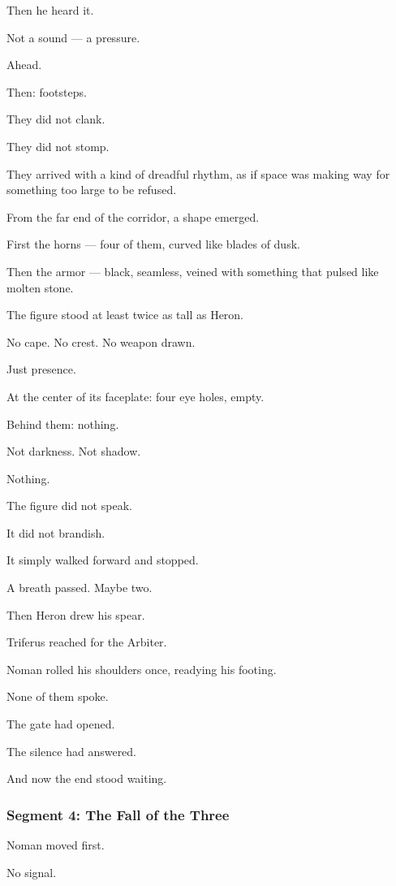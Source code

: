 \documentclass[9pt]{article}
\begin{document}
Then he heard it.

Not a sound — a pressure.

Ahead.

Then: footsteps.

\bigskip

They did not clank.

They did not stomp.

They arrived with a kind of dreadful rhythm, as if space was making way for something too large to be refused.

From the far end of the corridor, a shape emerged.

First the horns — four of them, curved like blades of dusk.

Then the armor — black, seamless, veined with something that pulsed like molten stone.

The figure stood at least twice as tall as Heron.

No cape. No crest. No weapon drawn.

Just presence.

At the center of its faceplate: four eye holes, empty.

Behind them: nothing.

Not darkness. Not shadow.

Nothing.

\bigskip

The figure did not speak.

It did not brandish.

It simply walked forward and stopped.

A breath passed. Maybe two.

Then Heron drew his spear.

Triferus reached for the Arbiter.

Noman rolled his shoulders once, readying his footing.

None of them spoke.

The gate had opened.

The silence had answered.

And now the end stood waiting.

\newpage

\subsubsection*{Segment 4: The Fall of the Three}

Noman moved first.

No signal.
\end{document}
